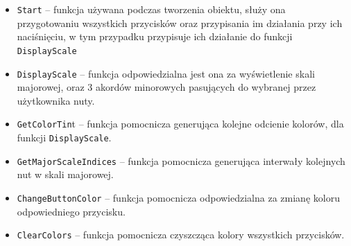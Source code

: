 \begin{itemize}
\item \texttt{Start} -- funkcja używana podczas tworzenia obiektu, służy ona przygotowaniu wszystkich przycisków oraz przypisania im działania przy ich naciśnięciu, w tym przypadku przypisuje ich działanie do funkcji \texttt{DisplayScale}
\item \texttt{DisplayScale} -- funkcja odpowiedzialna jest ona za wyświetlenie skali majorowej, oraz 3 akordów minorowych pasujących do wybranej przez użytkownika nuty. 
\item \texttt{GetColorTin}t -- funkcja pomocnicza generująca kolejne odcienie kolorów, dla funkcji \texttt{DisplayScale}.
\item \texttt{GetMajorScaleIndices} -- funkcja pomocnicza generująca interwały kolejnych nut w skali majorowej.
\item \texttt{ChangeButtonColor} -- funkcja pomocnicza odpowiedzialna za zmianę koloru odpowiedniego przycisku.
\item \texttt{ClearColors} -- funkcja pomocnicza czyszcząca kolory wszystkich przycisków.
\end{itemize}

